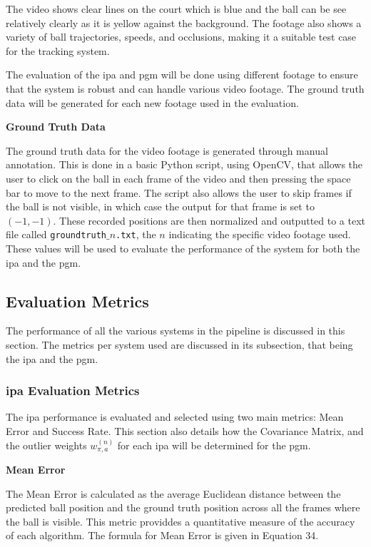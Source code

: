 \documentclass[12pt,a4paper]{article}
\begin{document}
The video shows clear lines on the court which is blue and the ball can be see relatively clearly as it is yellow against the background. The footage also shows a variety of ball trajectories, speeds, and occlusions, making it a suitable test case for the tracking system.

The evaluation of the \acs{ipa} and \acs{pgm} will be done using different footage to ensure that the system is robust and can handle various video footage. The ground truth data will be generated for each new footage used in the evaluation.

\textbf{Ground Truth Data}

The ground truth data for the video footage is generated through manual annotation. This is done in a basic Python script, using OpenCV, that allows the user to click on the ball in each frame of the video and then pressing the space bar to move to the next frame. The script also allows the user to skip frames if the ball is not visible, in which case the output for that frame is set to $(-1,-1)$. These recorded positions are then normalized and outputted to a text file called \texttt{groundtruth$\_n$.txt}, the $n$ indicating the specific video footage used. These values will be used to evaluate the performance of the system for both the \acs{ipa} and the \acs{pgm}.

\subsection{Evaluation Metrics}
The performance of all the various systems in the pipeline is discussed in this section. The metrics per system used are discussed in its subsection, that being the \acs{ipa} and the \acs{pgm}.

\subsubsection{\acs{ipa} Evaluation Metrics}
The \acs{ipa} performance is evaluated and selected using two main metrics: Mean Error and Success Rate. This section also details how the Covariance Matrix, and the outlier weights $w_{\pi,a}^{(n)}$ for each \acs{ipa} will be determined for the \acs{pgm}.

\textbf{Mean Error}

The Mean Error is calculated as the average Euclidean distance between the predicted ball position and the ground truth position across all the frames where the ball is visible. This metric providdes a quantitative measure of the accuracy of each algorithm. The formula for Mean Error is given in Equation 34.
\end{document}
